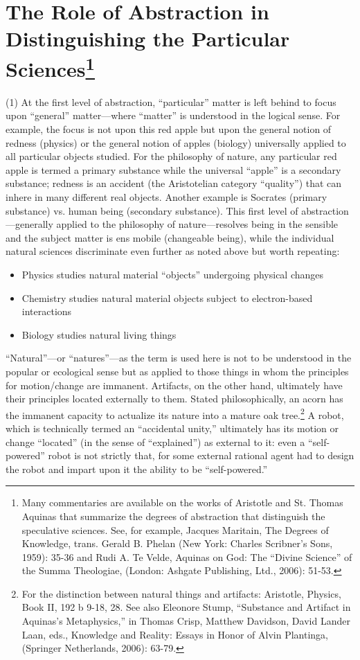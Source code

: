 \section[The Role of Abstraction in Distinguishing the Particular Sciences]{The Role of Abstraction in Distinguishing the Particular Sciences\footnote{Many commentaries are available on the works of Aristotle and St. Thomas Aquinas that summarize the degrees of abstraction that distinguish the speculative sciences. See, for example, Jacques Maritain, The Degrees of Knowledge, trans. Gerald B. Phelan (New York: Charles Scribner’s Sons, 1959): 35-36 and Rudi A. Te Velde, Aquinas on God: The “Divine Science” of the Summa Theologiae, (London: Ashgate Publishing, Ltd., 2006): 51-53.}}

(1) At the first level of abstraction, “particular” matter is left behind to focus upon “general” matter—where “matter” is understood in the logical sense. For example, the focus is not upon this red apple but upon the general notion of redness (physics) or the general notion of apples (biology) universally applied to all particular objects studied. For the philosophy of nature, any particular red apple is termed a primary substance while the universal “apple” is a secondary substance; redness is an accident (the Aristotelian category “quality”) that can inhere in many different real objects. Another example is Socrates (primary substance) vs. human being (secondary substance). This first level of abstraction—generally applied to the philosophy of nature—resolves being in the sensible and the subject matter is ens mobile (changeable being), while the individual natural sciences discriminate even further as noted above but worth repeating:

\begin{itemize}
\item Physics studies natural material “objects” undergoing physical changes
\item Chemistry studies natural material objects subject to electron-based interactions
\item Biology studies natural living things
\end{itemize}

“Natural”—or “natures”—as the term is used here is not to be understood in the popular or ecological sense but as applied to those things in whom the principles for motion/change are immanent. Artifacts, on the other hand, ultimately have their principles located externally to them. Stated philosophically, an acorn has the immanent capacity to actualize its nature into a mature oak tree.\footnote{For the distinction between natural things and artifacts: Aristotle, Physics, Book II, 192 b 9-18, 28. See also Eleonore Stump, “Substance and Artifact in Aquinas’s Metaphysics,” in Thomas Crisp, Matthew Davidson, David Lander Laan, eds., Knowledge and Reality: Essays in Honor of Alvin Plantinga, (Springer Netherlands, 2006): 63-79.} A robot, which is technically termed an “accidental unity,” ultimately has its motion or change “located” (in the sense of “explained”) as external to it: even a “self-powered” robot is not strictly that, for some external rational agent had to design the robot and impart upon it the ability to be “self-powered.”

